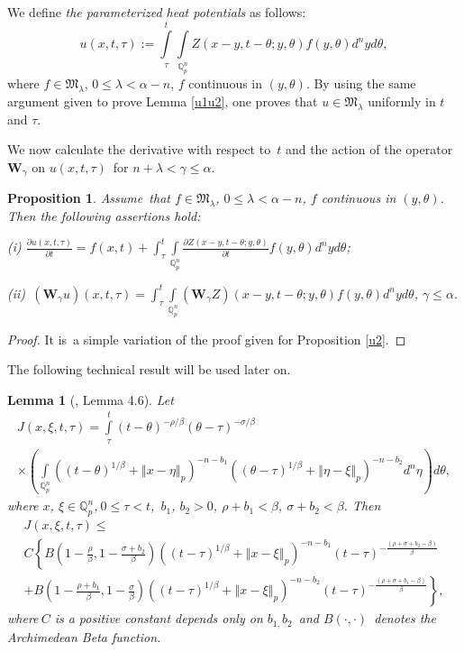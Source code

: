 \documentclass{amsart}\usepackage{amsfonts}
\theoremstyle{plain}
\newtheorem{lemma}[theorem]{Lemma}
\newtheorem{proposition}[theorem]{Proposition}
\numberwithin{equation}{section}
\begin{document}
We define \textit{the parameterized heat potentials} as follows:\[
u(x,t,\tau):={\displaystyle\int\limits_{\tau}^{t}}
\underset{\mathbb{Q}_{p}^{n}}{\int}Z(x-y,t-\theta;y,\theta)f(y,\theta
)d^{n}yd\theta,
\]
where $f\in\mathcal{\mathfrak{M}}_{\lambda}$, $0\leq\lambda<\alpha-n$, $f$
continuous in $(y,\theta)$. By using the same argument given to prove Lemma
\ref{u1u2}, one proves that $u\in\mathcal{\mathfrak{M}}_{\lambda}$ uniformly
in $t$ and $\tau$.

We now calculate the derivative with respect to\ $t$ and the action of the
operator $\mathbf{W}_{\gamma}$ on $u(x,t,\tau)$\ for $n+\lambda<\gamma
\leq\alpha$.

\begin{proposition}
\label{u3} Assume\ that $f\in\mathcal{\mathfrak{M}}_{\lambda}$, $0\leq
\lambda<\alpha-n$, $f$ continuous in $(y,\theta)$. Then the following
assertions hold:

(i) $\frac{\partial u(x,t,\tau)}{\partial t}=f(x,t)+\int_{\tau}^{t}\underset{\mathbb{Q}_{p}^{n}}{\int}\frac{\partial Z(x-y,t-\theta;y,\theta
)}{\partial t}f(y,\theta)d^{n}yd\theta$;

(ii)\ $(\mathbf{W}_{\gamma}u)(x,t,\tau)=\int_{\tau}^{t}\underset
{\mathbb{Q}_{p}^{n}}{\int}(\mathbf{W}_{\gamma}Z)(x-y,t-\theta;y,\theta
)f(y,\theta)d^{n}yd\theta$, $\gamma\leq\alpha$.
\end{proposition}

\begin{proof}
It is\ a simple variation of the proof given for Proposition \ref{u2}.
\end{proof}

The following technical result will be used later on.

\begin{lemma}
[\cite{Koch}, Lemma 4.6]\label{lema J<} Let\begin{multline*}
J(x,\xi,t,\tau)={\displaystyle\int\limits_{\tau}^{t}}
(t-\theta)^{-\rho/\beta}(\theta-\tau)^{-\sigma/\beta}\\
\times\left(  \underset{\mathbb{Q}_{p}^{n}}{\int}\left(  (t-\theta)^{1/\beta
}+\left\Vert x-\eta\right\Vert _{p}\right)  ^{-n-b_{1}}\left(  (\theta
-\tau)^{1/\beta}+\left\Vert \eta-\xi\right\Vert _{p}\right)  ^{-n-b_{2}}d^{n}\eta\right)  d\theta,
\end{multline*}
where $x$, $\xi\in\mathbb{Q}_{p}^{n}$,$\ 0\leq\tau<t$,\ $b_{1}$, $b_{2}>0$,
$\rho+b_{1}<\beta$, $\sigma+b_{2}<\beta$. Then\begin{multline*}
J(x,\xi,t,\tau)\leq\\
C\left\{  B\left(  1-\frac{\rho}{\beta},1-\frac{\sigma+b_{2}}{\beta}\right)
\left(  (t-\tau)^{1/\beta}+\left\Vert x-\xi\right\Vert _{p}\right)
^{-n-b_{1}}(t-\tau)^{-\frac{(\rho+\sigma+b_{2}-\beta)}{\beta}}\right. \\
+\left.  B\left(  1-\frac{\rho+b_{1}}{\beta},1-\frac{\sigma}{\beta}\right)
\left(  (t-\tau)^{1/\beta}+\left\Vert x-\xi\right\Vert _{p}\right)
^{-n-b_{2}}(t-\tau)^{-\frac{(\rho+\sigma+b_{1}-\beta)}{\beta}}\right\}  ,
\end{multline*}
where$\ C$ is a positive constant depends only on $b_{1,}b_{2}$\ and
$B(\cdot,\cdot)$\ denotes the Ar\-chimedean Beta function.
\end{lemma}
\end{document}
